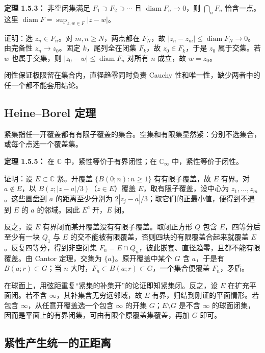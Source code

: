\documentclass[11pt,a4paper]{article}
\begin{document}
\textbf{定理 1.5.3：} 非空闭集满足 \(F_1\supset F_2\supset\cdots\) 且
\(\operatorname{diam}F_n\to0\)，则 \(\bigcap_nF_n\) 恰含一点。这里
\(\operatorname{diam}F=\sup_{z,w\in F}|z-w|\)。

证明：选 \(z_n\in F_n\)。对 \(m,n\ge N\)，两点都在 \(F_N\)，故
\(|z_n-z_m|\le\operatorname{diam}F_N\to0\)。由完备性
\(z_n\to z_0\)。固定 \(k\)，尾列全在闭集 \(F_k\)，故
\(z_0\in F_k\)，于是 \(z_0\) 属于交集。若 \(w\) 也属于交集，则
\(|z_0-w|\le\operatorname{diam}F_n\) 对所有 \(n\) 成立，故 \(w=z_0\)。

闭性保证极限留在集合内，直径趋零同时负责 Cauchy
性和唯一性，缺少两者中的任一个都不能套用结论。

\subsection{Heine--Borel 定理}\label{heineborel-ux5b9aux7406}

紧集指任一开覆盖都有有限子覆盖的集合。空集和有限集显然紧：分别不选集合，或每个点选一个覆盖集。

\textbf{定理 1.5.5：} 在 \(\mathbb C\) 中，紧性等价于有界闭性；在
\(\mathbb C_\infty\) 中，紧性等价于闭性。

证明：设 \(E\subset\mathbb C\) 紧。开覆盖 \(\{B(0;n):n\ge1\}\)
有有限子覆盖，故 \(E\) 有界。对 \(a\notin E\)，以
\(B(z;|z-a|/3)\)（\(z\in E\)）覆盖 \(E\)，取有限子覆盖，设中心为
\(z_1,\ldots,z_m\)。这些圆盘到 \(a\) 的距离至少分别为
\(2|z_j-a|/3\)；取它们的正最小值，便得到不遇到 \(E\) 的 \(a\)
的邻域。因此 \(E^c\) 开，\(E\) 闭。

反之，设 \(E\) 有界闭而某开覆盖没有有限子覆盖。取闭正方形 \(Q\) 包含
\(E\)，四等分后至少有一块 \(Q_1\) 与 \(E\)
的交不能被有限覆盖，否则四块的有限覆盖合起来就覆盖
\(E\)。反复四等分，得到非空闭集
\(F_n=E\cap Q_n\)，彼此嵌套、直径趋零，且都不能有限覆盖。由 Cantor
定理，交集为 \(\{a\}\)。原开覆盖中某个 \(G\) 含 \(a\)，于是有
\(B(a;r)\subset G\)；当 \(n\)
大时，\(F_n\subset B(a;r)\subset G\)，一个集合便覆盖 \(F_n\)，矛盾。

在球面上，用弦距重复``紧集的补集开''的论证即知紧集闭。反之，设 \(E\)
在扩充平面闭。若不含 \(\infty\)，其补集含无穷远邻域，故 \(E\)
有界，归结到刚证的平面情形。若包含 \(\infty\)，从任意开覆盖选一个包含
\(\infty\) 的开集 \(G\)；\(E\setminus G\) 是不含 \(\infty\)
的球面闭集，因而是平面上的有界闭集，可由有限个原覆盖集覆盖，再加 \(G\)
即可。

\subsection{紧性产生统一的正距离}\label{ux7d27ux6027ux4ea7ux751fux7edfux4e00ux7684ux6b63ux8dddux79bb}
\end{document}
